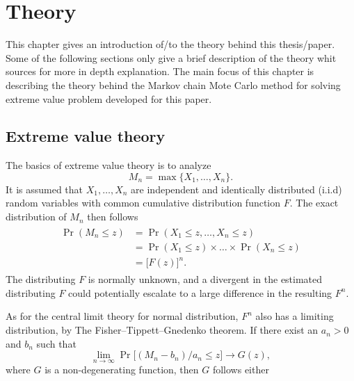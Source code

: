 \chapter[Theory]{Theory}
This chapter gives an introduction of/to the theory behind this thesis/paper. Some of the following sections only give a brief description of the theory whit sources for more in depth explanation. The main focus of this chapter is describing the theory behind the Markov chain Mote Carlo method for solving extreme value problem developed for this paper. 
\section{Extreme value theory}
The basics of extreme value theory is to analyze
\begin{equation}
M_n=\max\{X_1,\dots,X_n\}.
\end{equation}
It is assumed that $X_1,\dots,X_n$ are independent and identically distributed (i.i.d) random variables with common cumulative distribution function $F$.
The exact distribution of $M_n$ then follows
\begin{align}
\begin{split}
    \Pr(M_n \leq z)&=\Pr(X_1 \leq z,\dots, X_n \leq z)\\
    &=\Pr(X_1 \leq z)\times \dots \times \Pr(X_n \leq z)\\
    &=\big[F(z)\big]^n.   
\end{split}
\end{align}
The distributing $F$ is normally unknown, and a divergent in the estimated distributing $F$ could potentially escalate to a large difference in the resulting $F^n$. 

As for the central limit theory for normal distribution, $F^n$ also has a limiting distribution, by The Fisher–Tippett–Gnedenko theorem. If there exist an $a_n>0$ and $b_n$ such that 
\begin{equation}
\lim_{n \to \infty} \Pr\big[(M_n-b_n)/a_n \leq z\big]\to G(z),
\end{equation}
where $G$ is a non-degenerating function, then $G$ follows either

